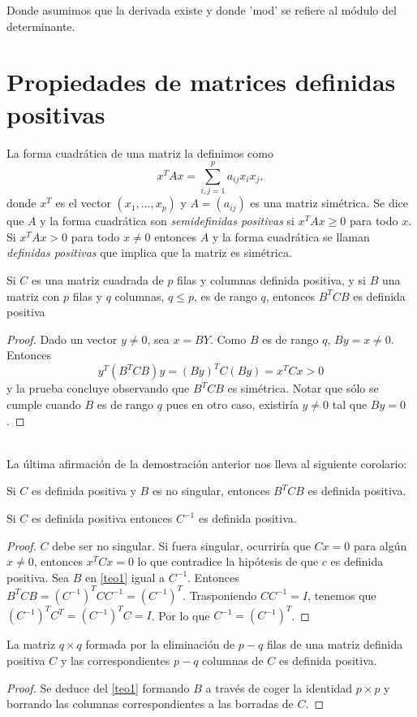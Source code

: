 Donde asumimos que la derivada existe y donde 'mod' se refiere al módulo del determinante. \\
\cite{anderson1958introduction}
\section{Propiedades de matrices definidas positivas}
La forma cuadrática de una matriz la definimos como 
\[x^TAx=\sum_{i,j=1}^p a_{ij}x_ix_j, \]
donde $x^T$ es el vector $(x_1,...,x_p)$ y $A=(a_{ij})$ es una matriz simétrica. Se dice que $A$ y la forma cuadrática son \textit{semidefinidas positivas} si $x^TAx \geq 0$ para todo $x$. Si $x^TAx > 0$ para todo $x \neq 0$ entonces $A$ y la forma cuadrática se llaman \textit{definidas positivas} que implica que la matriz es simétrica.
\begin{teorema}\label{teo1}
Si $C$ es una matriz cuadrada de $p$ filas y columnas definida positiva, y si $B$ una matriz con $p$ filas y $q$ columnas, $q \leq p$, es de rango $q$, entonces $B^TCB$ es definida positiva
\end{teorema}
\begin{proof}
Dado un vector $y\neq0$, sea $x=BY$. Como $B$ es de rango $q$, $By=x\neq 0$. Entonces
\[ y^T(B^TCB)y=(By)^TC(By)=x^TCx>0 \]
y la prueba concluye observando que  $B^TCB$ es simétrica. Notar que sólo se cumple cuando $B$ es de rango $q$ pues en otro caso, existiría $y \neq 0$ tal que $By=0$.
\end{proof}
\cite{anderson1958introduction}\\
La última afirmación de la demostración anterior nos lleva al siguiente corolario:
\begin{corolario}
Si $C$ es definida positiva y $B$ es no singular, entonces $B^TCB$ es definida positiva.
\end{corolario}
\begin{corolario}
Si $C$ es definida positiva entonces $C^{-1}$ es definida positiva.
\end{corolario}
\begin{proof}
$C$ debe ser no singular. Si fuera singular, ocurriría que $Cx=0$ para algún $x \neq 0$, entonces $x^TCx=0$ lo que contradice la hipótesis de que $c$ es definida positiva. Sea $B$ en \autoref{teo1} igual a $C^{-1}$. Entonces $B^TCB=(C^{-1})^TCC^{-1}=(C^{-1})^T$. Trasponiendo $CC^{-1}=I$, tenemos que $(C^{-1})^TC^T=(C^{-1})^TC=I$. Por lo que $C^{-1}=(C^{-1})^T$.
\end{proof}

\begin{corolario}
La matriz $q \times q$ formada por la eliminación de $p-q$ filas de una matriz definida positiva $C$ y las correspondientes $p-q$ columnas de $C$ es definida positiva.
\end{corolario}
\begin{proof}
Se deduce del \autoref{teo1} formando $B$ a través de coger la identidad $p \times p$ y borrando las columnas correspondientes a las borradas de $C$.
\end{proof}

